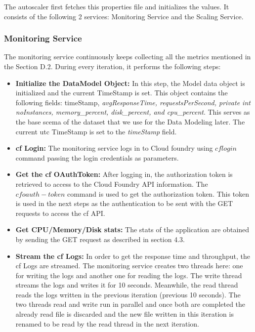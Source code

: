 \documentclass[article,type=msc,colorback,12pt,accentcolor=tud8b,table]{tudthesis}
\begin{document}
	The autoscaler first fetches this properties file and initializes the values. It consists of the following 2 services: Monitoring Service and the Scaling Service. 
	
\subsubsection{Monitoring Service}
	
	The monitoring service continuously keeps collecting all the metrics mentioned in the Section D.2. During every iteration, it performs the following steps:
	\begin{itemize}
		\item{\textbf{Initialize the DataModel Object:}} In this step, the Model data object is initialized and the current TimeStamp is set. This object contains the following fields: timeStamp, \textit{avgResponseTime, requestsPerSecond, private int noInstances, memory\_percent, disk\_percent, and cpu\_percent}. This serves as the base scema of the dataset that we use for the Data Modeling later. The current \gls{utc} TimeStamp is set to the \textit{timeStamp} field.

\item{\textbf{\gls{cf} Login:}} The monitoring service logs in to Cloud foundry using $cf login$ command passing the login credentials as parameters.

\item{\textbf{Get the \gls{cf} OAuthToken:}} After logging in, the authorization token is retrieved to access to the Cloud Foundry API information. The $cf oauth-token$ command is used to get the authorization token. This token is used in the next steps as the authentication to be sent with the GET requests to access the \gls{cf} API.
		
\item{\textbf{Get CPU/Memory/Disk stats:}} 
The stats of the application are obtained by sending the GET request as described in section 4.3.
		
\item{\textbf{Stream the \gls{cf} Logs:}} In order to get the response time and throughput, the \gls{cf} Logs are streamed. The monitoring service creates two threads here: one for writing the logs and another one for reading the logs. The write thread streams the logs and writes it for 10 seconds. Meanwhile, the read thread reads the logs written in the previous iteration (previous 10 seconds). The two threads read and write run in parallel and once both are completed the already read file is discarded and the new file written in this iteration is renamed to be read by the read thread in the next iteration.


\end{itemize}
\end{document}
